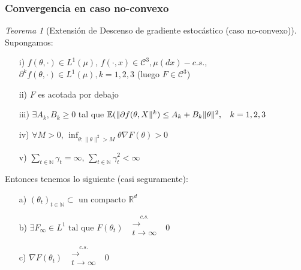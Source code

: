 \documentclass[letterpaper,11pt]{article} %
\def\espacio{\hspace{.25cm}\,}
\theoremstyle{defbreak}
\theoremstyle{propbreak}
\theoremstyle{remark}
\theoremstyle{break}
\newtheorem{theorem}{Teorema}[subsection]
\def\R{\mathbb{R}}
\def\E{\mathbb{E}}
\def\N{\mathbb{N}}
\def\convcst{\mbox{ }\overset{c.s.}{\substack{\longrightarrow \\t \to \infty}}\mbox{ }}
\begin{document}
\subsubsection{Convergencia en caso no-convexo}
\begin{theorem}[Extensión de Descenso de gradiente estocástico (caso no-convexo)]
\label{theorem:sgd_no_conv}
Supongamos:
\begin{itemize}
    \item[i)] $f(\theta,\cdot)\in L^1(\mu)$, $f(\cdot,x)\in\mathcal{C}^3,  \mu(dx)-c.s.$, $\partial^k f(\theta,\cdot)\in L^1(\mu), k=1,2,3$ (luego $F\in\mathcal{C}^3$)
    \item[ii)] $F$ es acotada por debajo
    \item[iii)] $\exists A_k,B_k\geq 0$ tal que $\E(\|\partial f(\theta,X\|^k)\leq A_k+B_k\|\theta\|^2,\espacio k=1,2,3$
    \item[iv)] $\forall M >0$, $\displaystyle \inf_{\theta:\|\theta\|^2>M}\theta\nabla F(\theta)>0$
    \item[v)] $\sum_{t\in\N}\gamma_t=\infty$, $\sum_{t\in\N}\gamma_t^2<\infty$
\end{itemize}
Entonces tenemos lo siguiente (casi seguramente):
\begin{itemize}
    \item[a)] $(\theta_t)_{t\in\N}\subset \mbox{ un compacto }\R^d$
    \item[b)] $\exists F_\infty \in L^1 \mbox{ tal que }F(\theta_t)\convcst0$
    \item[c)] $\nabla F(\theta_t)\convcst 0$
\end{itemize}
\end{theorem}
\end{document}
